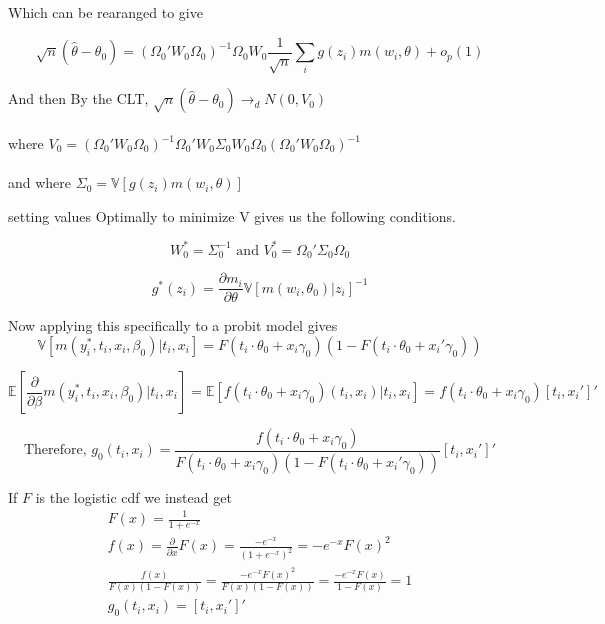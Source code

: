 \documentclass[11pt]{article}
\begin{document}
Which can be rearanged to give 

$$\sqrt n(\hat{\theta}-\theta_0) = (\Omega_0'W_0\Omega_0)^{-1}\Omega_0W_0\frac{1}{\sqrt n}\sum_i g(z_i)m(w_i,\theta) + o_p(1)$$

And then  By the CLT, $\sqrt n(\hat{\theta}-\theta_0) \rightarrow_d N(0,V_0)$ \\ \\
where $ V_0 = (\Omega_0'W_0\Omega_0)^{-1}\Omega_0'W_0\Sigma_0W_0\Omega_0(\Omega_0'W_0\Omega_0)^{-1}$\\ \\ 

and where $ \Sigma_0 = \mathbb{V}[g(z_i)m(w_i,\theta)]$


 setting values Optimally to minimize V gives us the following conditions. 
 
 $$ W_0^* = \Sigma_0^{-1} \text{ and } V_0^* = \Omega_0'\Sigma_0\Omega_0$$

$$g^*(z_i) = \frac{\partial m_i}{\partial \theta} \mathbb{V}[m(w_i,\theta_0)|z_i]^{-1} $$


Now applying this specifically to a probit model gives 
$$ \mathbb{V}[m(y_i^*,t_i,x_i,\beta_0)|t_i,x_i]=F(t_i \cdot \theta_0+x_i\gamma_0)(1-F(t_i \cdot \theta_0 + x_i'\gamma_0))$$

$$\mathbb{E}[\frac{\partial}{\partial \beta}m(y_i^*,t_i,x_i,\beta_0)|t_i,x_i] = \mathbb{E}[f(t_i \cdot \theta_0+x_i\gamma_0)(t_i,x_i)|t_i,x_i]
= f(t_i \cdot \theta_0+x_i\gamma_0)[t_i,x_i']'$$

$$\text{Therefore, } g_0(t_i,x_i) = \frac{f(t_i \cdot \theta_0+x_i\gamma_0)}{F(t_i \cdot \theta_0+x_i\gamma_0)(1-F(t_i \cdot \theta_0 + x_i'\gamma_0))}[t_i,x_i']'$$


If $F$ is the logistic cdf we instead get 
\begin{align*}
F(x) = \frac{1}{1+e^{-x}}\\
f(x) = \frac{\partial}{\partial x}F(x) = \frac{-e^{-x}}{(1+e^{-x})^2} =-e^{-x}F(x)^2\\
\frac{f(x)}{F(x)(1-F(x))} = \frac{-e^{-x}F(x)^2}{F(x)(1-F(x))} = \frac{-e^{-x}F(x)}{1-F(x)} = 1 \\
g_0(t_i,x_i) = [t_i,x_i']'
\end{align*}
\end{document}
